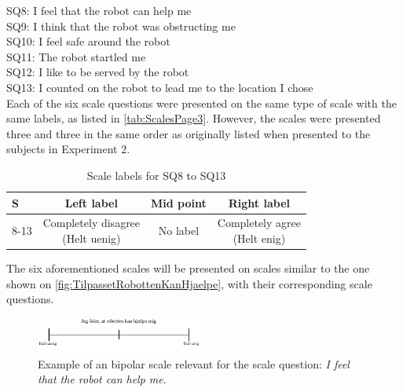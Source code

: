 \noindent
% 
SQ8: I feel that the robot can help me\\%
SQ9: I think that the robot was obstructing me\\%
SQ10: I feel safe around the robot\\%
SQ11: The robot startled me\\ %
SQ12: I like to be served by the robot\\%
SQ13: I counted on the robot to lead me to the location I chose\\%
Each of the six scale questions were presented on the same type of scale with the same labels, as listed in \autoref{tab:ScalesPage3}. However, the scales were presented three and three in the same order as originally listed when presented to the subjects in Experiment 2.
%
\begin{table}[H]
	\centering
\caption{Scale labels for SQ8 to SQ13}
	\label{tab:ScalesPage3} 
	\begin{tabular}{l|c|c|c}
		S     & Left label & Mid point & Right label \\\hline
		8-13   & \makecell{Completely disagree\\(Helt uenig)}  & No label & \makecell{Completely agree\\(Helt enig)}                      
	\end{tabular}        
\end{table}
\noindent
%
The six aforementioned scales will be presented on scales similar to the one shown on \autoref{fig:TilpassetRobottenKanHjaelpe}, with their corresponding scale questions. 
%
\begin{figure}[H]
\centering
\includegraphics[width = 0.49\textwidth]{Figure/TilpassetRobottenKanHjaelpe}
\setlength{} 
\caption{Example of an bipolar scale relevant for the scale question: \textit{I feel that the robot can help me}.}
\label{fig:TilpassetRobottenKanHjaelpe}
\end{figure}
